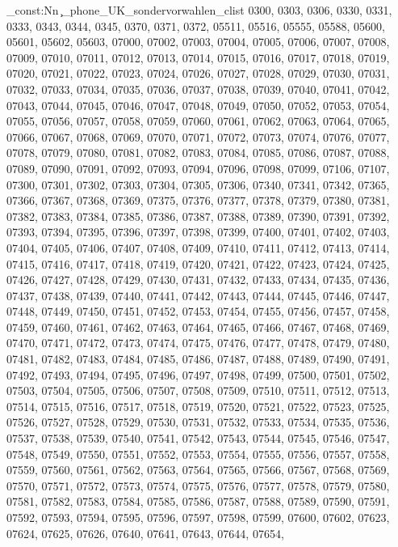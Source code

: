 \clist_const:Nn \c_phone_UK_sondervorwahlen_clist {0300,
0303,
0306,
0330,
0331,
0333,
0343,
0344,
0345,
0370,
0371,
0372,
05511,
05516,
05555,
05588,
05600,
05601,
05602,
05603,
07000,
07002,
07003,
07004,
07005,
07006,
07007,
07008,
07009,
07010,
07011,
07012,
07013,
07014,
07015,
07016,
07017,
07018,
07019,
07020,
07021,
07022,
07023,
07024,
07026,
07027,
07028,
07029,
07030,
07031,
07032,
07033,
07034,
07035,
07036,
07037,
07038,
07039,
07040,
07041,
07042,
07043,
07044,
07045,
07046,
07047,
07048,
07049,
07050,
07052,
07053,
07054,
07055,
07056,
07057,
07058,
07059,
07060,
07061,
07062,
07063,
07064,
07065,
07066,
07067,
07068,
07069,
07070,
07071,
07072,
07073,
07074,
07076,
07077,
07078,
07079,
07080,
07081,
07082,
07083,
07084,
07085,
07086,
07087,
07088,
07089,
07090,
07091,
07092,
07093,
07094,
07096,
07098,
07099,
07106,
07107,
07300,
07301,
07302,
07303,
07304,
07305,
07306,
07340,
07341,
07342,
07365,
07366,
07367,
07368,
07369,
07375,
07376,
07377,
07378,
07379,
07380,
07381,
07382,
07383,
07384,
07385,
07386,
07387,
07388,
07389,
07390,
07391,
07392,
07393,
07394,
07395,
07396,
07397,
07398,
07399,
07400,
07401,
07402,
07403,
07404,
07405,
07406,
07407,
07408,
07409,
07410,
07411,
07412,
07413,
07414,
07415,
07416,
07417,
07418,
07419,
07420,
07421,
07422,
07423,
07424,
07425,
07426,
07427,
07428,
07429,
07430,
07431,
07432,
07433,
07434,
07435,
07436,
07437,
07438,
07439,
07440,
07441,
07442,
07443,
07444,
07445,
07446,
07447,
07448,
07449,
07450,
07451,
07452,
07453,
07454,
07455,
07456,
07457,
07458,
07459,
07460,
07461,
07462,
07463,
07464,
07465,
07466,
07467,
07468,
07469,
07470,
07471,
07472,
07473,
07474,
07475,
07476,
07477,
07478,
07479,
07480,
07481,
07482,
07483,
07484,
07485,
07486,
07487,
07488,
07489,
07490,
07491,
07492,
07493,
07494,
07495,
07496,
07497,
07498,
07499,
07500,
07501,
07502,
07503,
07504,
07505,
07506,
07507,
07508,
07509,
07510,
07511,
07512,
07513,
07514,
07515,
07516,
07517,
07518,
07519,
07520,
07521,
07522,
07523,
07525,
07526,
07527,
07528,
07529,
07530,
07531,
07532,
07533,
07534,
07535,
07536,
07537,
07538,
07539,
07540,
07541,
07542,
07543,
07544,
07545,
07546,
07547,
07548,
07549,
07550,
07551,
07552,
07553,
07554,
07555,
07556,
07557,
07558,
07559,
07560,
07561,
07562,
07563,
07564,
07565,
07566,
07567,
07568,
07569,
07570,
07571,
07572,
07573,
07574,
07575,
07576,
07577,
07578,
07579,
07580,
07581,
07582,
07583,
07584,
07585,
07586,
07587,
07588,
07589,
07590,
07591,
07592,
07593,
07594,
07595,
07596,
07597,
07598,
07599,
07600,
07602,
07623,
07624,
07625,
07626,
07640,
07641,
07643,
07644,
07654,
}
